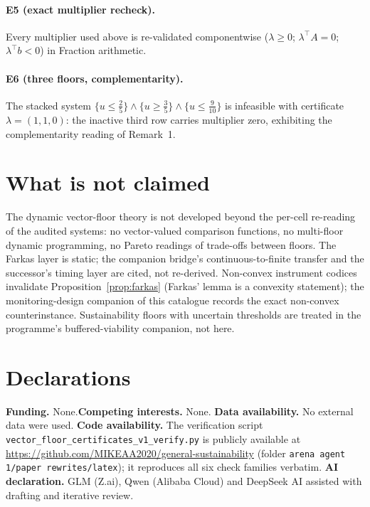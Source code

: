 \documentclass[10pt,twocolumn]{article}
\theoremstyle{definition}
\begin{document}
\paragraph{E5 (exact multiplier recheck).}
Every multiplier used above is re-validated componentwise
($\lambda\ge0$; $\lambda^{\top}A=0$; $\lambda^{\top}b<0$) in Fraction
arithmetic.

\paragraph{E6 (three floors, complementarity).}
The stacked system $\{u\le\tfrac25\}\wedge\{u\ge\tfrac35\}\wedge
\{u\le\tfrac9{10}\}$ is infeasible with certificate $\lambda=(1,1,0)$: the
inactive third row carries multiplier zero, exhibiting the complementarity
reading of Remark~1.

\section{What is not claimed}

The dynamic vector-floor theory is not developed beyond the per-cell
re-reading of the audited systems: no vector-valued comparison functions,
no multi-floor dynamic programming, no Pareto readings of trade-offs
between floors. The Farkas layer is static; the companion bridge's
continuous-to-finite transfer and the successor's timing layer are cited,
not re-derived. Non-convex instrument codices invalidate
Proposition~\ref{prop:farkas} (Farkas' lemma is a convexity statement);
the monitoring-design companion of this catalogue records the exact
non-convex counterinstance. Sustainability floors with uncertain
thresholds are treated in the programme's buffered-viability companion, not
here.

\section*{Declarations}
\textbf{Funding.} None.\quad \textbf{Competing interests.} None.\quad
\textbf{Data availability.} No external data were used.\quad
\textbf{Code availability.} The verification script
\texttt{vector\_floor\_certificates\_v1\_verify.py} is publicly available at
\url{https://github.com/MIKEAA2020/general-sustainability} (folder
\texttt{arena agent 1/paper rewrites/latex}); it reproduces all six check
families verbatim.\quad
\textbf{AI declaration.} GLM (Z.ai), Qwen (Alibaba Cloud) and DeepSeek AI
assisted with drafting and iterative review.
\end{document}
